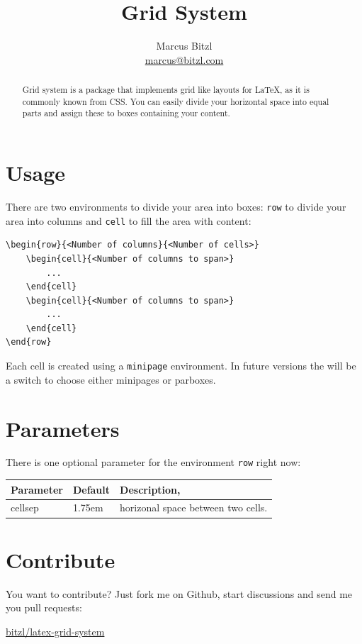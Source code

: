 \documentclass[DIV13,a4paper]{scrartcl}
\title{Grid System}
\author{Marcus Bitzl\\ \url{marcus@bitzl.com}}
\begin{document}
	\maketitle
	
	\begin{abstract}
		Grid system is a package that implements grid like layouts for \LaTeX, as it is commonly known from CSS. You can easily divide your horizontal space into equal parts and assign these to boxes containing your content.
	\end{abstract}
	
	\section{Usage}
	There are two environments to divide your area into boxes: \texttt{row} to divide your area into columns and \texttt{cell} to fill the area with content:
	
	\medskip
	
	\begin{lstlisting}
\begin{row}{<Number of columns}{<Number of cells>}
	\begin{cell}{<Number of columns to span>}
		...
	\end{cell}
	\begin{cell}{<Number of columns to span>}
		...
	\end{cell}
\end{row}
	\end{lstlisting}
	
	Each cell is created using a \texttt{minipage} environment. In future versions the will be a switch to choose either minipages or parboxes.
	
	\section{Parameters}
	There is one optional parameter for the environment \texttt{row} right now:
	
	\medskip
	
	\begin{tabularx}{\linewidth}{llX}\toprule
		\textbf{Parameter} & \textbf{Default} & \textbf{Description},\\ \midrule 
		cellsep & 1.75em & horizonal space between two cells.\\\bottomrule
	\end{tabularx}
	
	\section{Contribute}
	You want to contribute? Just fork me on Github, start discussions and send me you pull requests: 
	\begin{center}
		\href{https://github.com/bitzl/latex-grid-system}{\ttfamily bitzl/latex-grid-system}
	\end{center}
	
\end{document}

